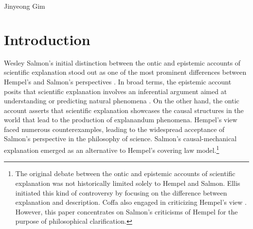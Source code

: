 \begin{artengenv}{Jinyeong Gim}
\section*{Introduction}
\lettrine[loversize=0.13,lines=2,lraise=-0.03,nindent=0em,findent=0.2pt]%
{W}{}esley Salmon's initial distinction between the ontic and epistemic accounts of scientific explanation stood out as one of the most prominent differences between Hempel's and Salmon's perspectives
\parencites[][]{salmon_scientific_1984}[][]{salmon_four_1989}. %
 In broad terms, the epistemic account posits that scientific explanation involves an inferential argument aimed at understanding or predicting natural phenomena 
\parencites[see][]{hempel_studies_1948}[][]{hempel_aspects_1965}. %
 On the other hand, the ontic account asserts that scientific explanation showcases the causal structures in the world that lead to the production of explanandum phenomena. Hempel's view faced numerous counterexamples, leading to the widespread acceptance of Salmon's perspective in the philosophy of science. Salmon's causal-mechanical explanation emerged as an alternative to Hempel's covering law model.\footnote{The original debate between the ontic and epistemic accounts of scientific explanation was not historically limited solely to Hempel and Salmon. Ellis 
\parencite*[][]{ellis_relation_1956} %
 initiated this kind of controversy by focusing on the difference between explanation and description. Coffa 
\parencite*[][]{coffa_foundations_1973} %
 also engaged in criticizing Hempel's view 
\parencite[see][]{wright_ontic_2018}. %
 However, this paper concentrates on Salmon's criticisms of Hempel for the purpose of philosophical clarification.}


\end{artengenv}
